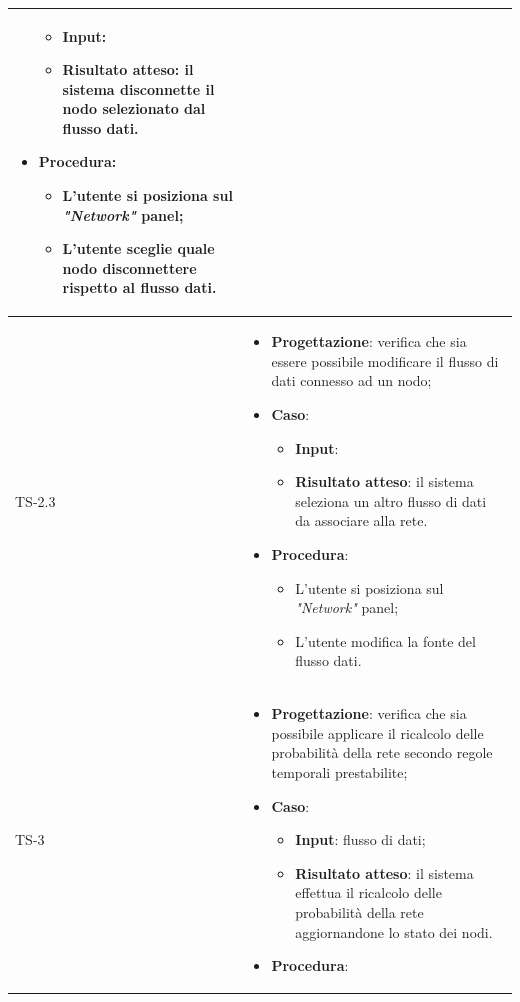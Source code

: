 \begin{longtable}{|C{2.5cm}|C{13cm}|}
\begin{itemize}
	\begin{itemize}
		\item \textbf{Input}: 
		\item \textbf{Risultato atteso}: il sistema disconnette il nodo selezionato dal flusso dati.
	\end{itemize}
	\item \textbf{Procedura}:
	\begin{itemize}
		\item L'utente si posiziona sul \emph{"Network"} panel;
		\item L'utente sceglie quale nodo disconnettere rispetto al flusso dati.
	\end{itemize} 
\end{itemize}
	 \\
	\hline
	{TS-2.3} &
\begin{itemize}
	\item \textbf{Progettazione}: verifica che sia essere possibile modificare il
	flusso di dati connesso ad un nodo;
	\item \textbf{Caso}: 
	\begin{itemize}
		\item \textbf{Input}: 
		\item \textbf{Risultato atteso}: il sistema  seleziona un altro flusso di dati da associare alla rete.
	\end{itemize}
	\item \textbf{Procedura}:
	\begin{itemize}
		\item L'utente si posiziona sul \emph{"Network"} panel;
		\item L'utente modifica la fonte del flusso dati.
	\end{itemize} 
\end{itemize}	
	  \\
	\hline
	{TS-3} & 
\begin{itemize}
	\item \textbf{Progettazione}: verifica che sia possibile applicare il
	ricalcolo delle probabilità della rete secondo regole temporali prestabilite;
	\item \textbf{Caso}: 
	\begin{itemize}
		\item \textbf{Input}: flusso di dati;
		\item \textbf{Risultato atteso}: il sistema effettua il ricalcolo delle probabilità della
		rete aggiornandone lo stato dei nodi.
	\end{itemize}
	\item \textbf{Procedura}:

\end{itemize}
\end{longtable}
